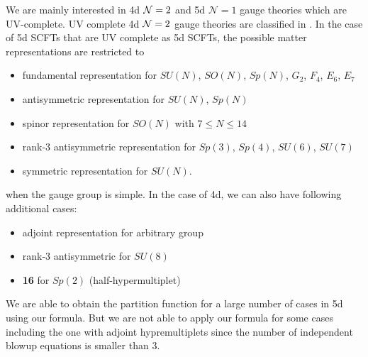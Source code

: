 \documentclass[letterpaper, 11pt]{article}
\def\CN{{\cal N}}
\begin{document}
We are mainly interested in 4d $\CN=2$ and 5d $\mathcal{N}=1$ gauge theories which are UV-complete.  
UV complete 4d $\CN=2$ gauge theories are classified in \cite{Bhardwaj:2013qia}. 
In the case of 5d SCFTs that are UV complete as 5d SCFTs, the possible matter representations are restricted to \cite{Jefferson:2017ahm}
\begin{itemize}
  \item fundamental representation for $SU(N)$, $SO(N)$, $Sp(N)$, $G_2$, $F_4$, $E_6$, $E_7$
  \item antisymmetric representation for $SU(N)$, $Sp(N)$
  \item spinor representation for $SO(N)$ with $7 \leq N \leq 14$
  \item rank-3 antisymmetric representation for $Sp(3)$, $Sp(4)$, $SU(6)$, $SU(7)$
  \item symmetric representation for $SU(N)$.
\end{itemize}
when the gauge group is simple. In the case of 4d, we can also have following additional cases: 
\begin{itemize}
	\item adjoint representation for arbitrary group
	\item rank-3 antisymmetric for $SU(8)$
	\item \textbf{16} for $Sp(2)$ (half-hypermultiplet)
\end{itemize}
We are able to obtain the partition function for a large number of cases in 5d using our formula. But we are not able to apply our formula for some cases including the one with adjoint hypremultiplets since the number of independent blowup equations is smaller than 3. 
\end{document}
